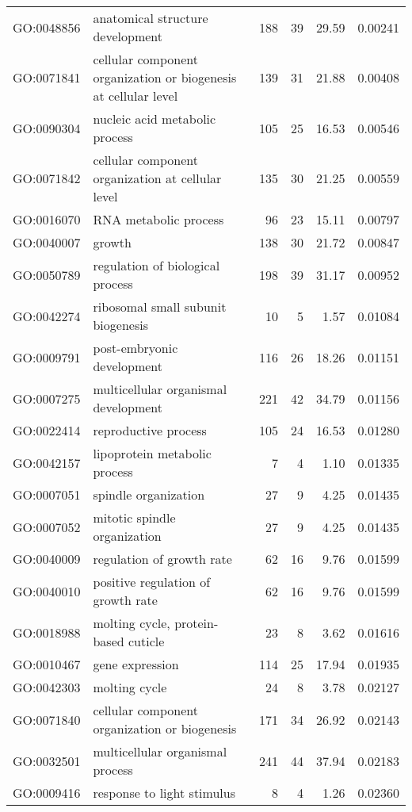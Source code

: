 \begin{longtable}{lp{4.5cm}rrrl}
  GO:0048856 & anatomical structure development & 188 &  39 & 29.59 & 0.00241 \\ 
  GO:0071841 & cellular component organization or biogenesis at cellular level & 139 &  31 & 21.88 & 0.00408 \\ 
  GO:0090304 & nucleic acid metabolic process & 105 &  25 & 16.53 & 0.00546 \\ 
  GO:0071842 & cellular component organization at cellular level & 135 &  30 & 21.25 & 0.00559 \\ 
  GO:0016070 & RNA metabolic process &  96 &  23 & 15.11 & 0.00797 \\ 
  GO:0040007 & growth & 138 &  30 & 21.72 & 0.00847 \\ 
  GO:0050789 & regulation of biological process & 198 &  39 & 31.17 & 0.00952 \\ 
  GO:0042274 & ribosomal small subunit biogenesis &  10 &   5 & 1.57 & 0.01084 \\ 
  GO:0009791 & post-embryonic development & 116 &  26 & 18.26 & 0.01151 \\ 
  GO:0007275 & multicellular organismal development & 221 &  42 & 34.79 & 0.01156 \\ 
  GO:0022414 & reproductive process & 105 &  24 & 16.53 & 0.01280 \\ 
  GO:0042157 & lipoprotein metabolic process &   7 &   4 & 1.10 & 0.01335 \\ 
  GO:0007051 & spindle organization &  27 &   9 & 4.25 & 0.01435 \\ 
  GO:0007052 & mitotic spindle organization &  27 &   9 & 4.25 & 0.01435 \\ 
  GO:0040009 & regulation of growth rate &  62 &  16 & 9.76 & 0.01599 \\ 
  GO:0040010 & positive regulation of growth rate &  62 &  16 & 9.76 & 0.01599 \\ 
  GO:0018988 & molting cycle, protein-based cuticle &  23 &   8 & 3.62 & 0.01616 \\ 
  GO:0010467 & gene expression & 114 &  25 & 17.94 & 0.01935 \\ 
  GO:0042303 & molting cycle &  24 &   8 & 3.78 & 0.02127 \\ 
  GO:0071840 & cellular component organization or biogenesis & 171 &  34 & 26.92 & 0.02143 \\ 
  GO:0032501 & multicellular organismal process & 241 &  44 & 37.94 & 0.02183 \\ 
  GO:0009416 & response to light stimulus &   8 &   4 & 1.26 & 0.02360 \\ 

\end{longtable}
